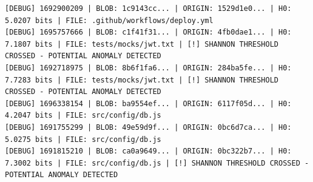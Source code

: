 \documentclass[12pt, a4paper, oneside]{report}
\begin{document}
\begin{lstlisting}[basicstyle=\tiny\ttfamily]
[DEBUG] 1692900209 | BLOB: 1c9143cc... | ORIGIN: 1529d1e0... | H0: 5.0207 bits | FILE: .github/workflows/deploy.yml
[DEBUG] 1695757666 | BLOB: c1f41f31... | ORIGIN: 4fb0dae1... | H0: 7.1807 bits | FILE: tests/mocks/jwt.txt | [!] SHANNON THRESHOLD CROSSED - POTENTIAL ANOMALY DETECTED
[DEBUG] 1692718975 | BLOB: 8b6f1fa6... | ORIGIN: 284ba5fe... | H0: 7.7283 bits | FILE: tests/mocks/jwt.txt | [!] SHANNON THRESHOLD CROSSED - POTENTIAL ANOMALY DETECTED
[DEBUG] 1696338154 | BLOB: ba9554ef... | ORIGIN: 6117f05d... | H0: 4.2047 bits | FILE: src/config/db.js
[DEBUG] 1691755299 | BLOB: 49e59d9f... | ORIGIN: 0bc6d7ca... | H0: 5.0275 bits | FILE: src/config/db.js
[DEBUG] 1691815210 | BLOB: ca0a9649... | ORIGIN: 0bc322b7... | H0: 7.3002 bits | FILE: src/config/db.js | [!] SHANNON THRESHOLD CROSSED - POTENTIAL ANOMALY DETECTED
\end{lstlisting}
\end{document}
